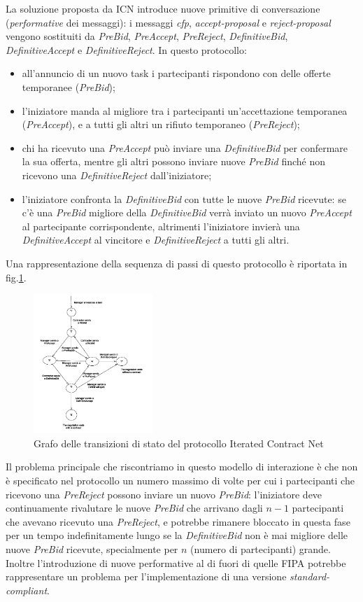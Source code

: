 \documentclass[a4paper, 10pt, conference]{ieeeconf} %
\begin{document}
La soluzione proposta da ICN introduce nuove primitive di conversazione (\emph{performative} dei messaggi): i messaggi \emph{cfp}, \emph{accept-proposal} e \emph{reject-proposal} vengono sostituiti da \emph{PreBid}, \emph{PreAccept}, \emph{PreReject}, \emph{DefinitiveBid}, \emph{DefinitiveAccept} e \emph{DefinitiveReject}. In questo protocollo:
\begin{itemize}
\item{all'annuncio di un nuovo task i partecipanti rispondono con delle offerte temporanee (\emph{PreBid});}
\item{l'iniziatore manda al migliore tra i partecipanti un'accettazione temporanea (\emph{PreAccept}), e a tutti gli altri un rifiuto temporaneo (\emph{PreReject});}
\item{chi ha ricevuto una \emph{PreAccept} può inviare una \emph{DefinitiveBid} per confermare la sua offerta, mentre gli altri possono inviare nuove \emph{PreBid} finché non ricevono una \emph{DefinitiveReject} dall'iniziatore;}
\item{l'iniziatore confronta la \emph{DefinitiveBid} con tutte le nuove \emph{PreBid} ricevute: se c'è una \emph{PreBid} migliore della \emph{DefinitiveBid} verrà inviato un nuovo \emph{PreAccept} al partecipante corrispondente, altrimenti l'iniziatore invierà una \emph{DefinitiveAccept} al vincitore e \emph{DefinitiveReject} a tutti gli altri.}
\end{itemize}
Una rappresentazione della sequenza di passi di questo protocollo è riportata in fig.\ref{f2}.

\begin{figure}[!b]
\centering
\includegraphics[width=0.4\textwidth]{icn.png}
\caption{Grafo delle transizioni di stato del protocollo Iterated Contract Net} \label{f2}
\end{figure}

Il problema principale che riscontriamo in questo modello di interazione è che non è specificato nel protocollo un numero massimo di volte per cui i partecipanti che ricevono una \emph{PreReject} possono inviare un nuovo \emph{PreBid}: l'iniziatore deve continuamente rivalutare le nuove \emph{PreBid} che arrivano dagli $n - 1$ partecipanti che avevano ricevuto una \emph{PreReject}, e potrebbe rimanere bloccato in questa fase per un tempo indefinitamente lungo se la \emph{DefinitiveBid} non è mai migliore delle nuove \emph{PreBid} ricevute, specialmente per $n$ (numero di partecipanti) grande. Inoltre l'introduzione di nuove performative al di fuori di quelle FIPA potrebbe rappresentare un problema per l'implementazione di una versione \emph{standard-compliant}.
\end{document}
